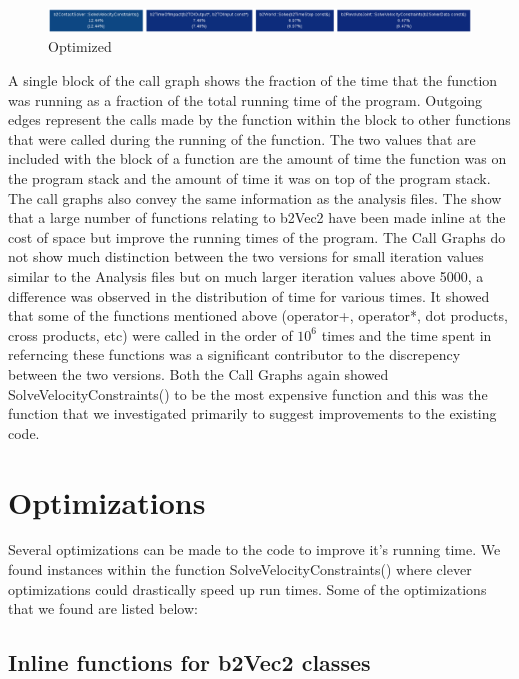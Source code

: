 \documentclass[11pt] {article}
\begin{document}
\begin {figure} [ht]
\begin {center}
\includegraphics[scale = 0.4] {releaseProfile.eps}
\end {center}
\caption {Optimized}
\end {figure}

A single block of the call graph shows the fraction of the time that the function was running as
a fraction of the total running time of the program. Outgoing edges represent the calls made by the
function within the block to other functions that were called during the running of the function. The 
two values that are included with the block of a function are the amount of time the function was on the
program stack and the amount of time it was on top of the program stack. The call graphs also convey the same information
 as the analysis files. The show that a large number of functions relating to b2Vec2 have been made 
 inline at the cost of space but improve the running times of the program. The Call Graphs do not
 show much distinction between the two versions for small iteration values similar to the Analysis 
files but on much larger iteration values above 5000, a difference was observed in the distribution 
of time for various times. It showed that some of the functions mentioned above (operator+, operator*, 
dot products, cross products, etc) were called in the order of $10^{6}$ times and the time spent in 
referncing these functions was a significant contributor to the discrepency between the two versions. 
Both the Call Graphs again showed SolveVelocityConstraints() to be the most expensive function and 
this was the function that we investigated primarily to suggest improvements to the existing code. 

\section{Optimizations}

Several optimizations can be made to the code to improve it's running time. We found instances within
the function SolveVelocityConstraints() where clever optimizations could drastically speed up run times.
Some of the optimizations that we found are listed below:

\subsection {Inline functions for b2Vec2 classes}
\end{document}
